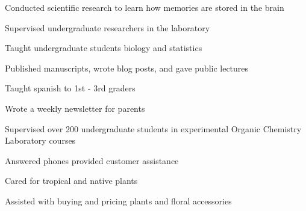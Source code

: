 \documentclass[]{deedy-resume-openfont}
\begin{document}
\begin{minipage}[t]{0.79\textwidth}

\begin{tightemize}
\item Conducted scientific research to learn how memories are stored in the brain
\item Supervised undergraduate researchers in the laboratory
\item Taught undergraduate students biology and statistics
\item Published manuscripts, wrote blog posts, and gave public lectures
\end{tightemize}
\sectionsep

\begin{tightemize}
\item Taught spanish to 1st - 3rd graders
\item Wrote a weekly newsletter for parents
\end{tightemize}
\sectionsep

\begin{tightemize}
\item Supervised over 200 undergraduate students in experimental Organic Chemistry Laboratory courses 
\end{tightemize}
\sectionsep

\begin{tightemize}
\item Answered phones provided customer assistance
\item Cared for tropical and native plants
\item Assisted with buying and pricing plants and floral accessories
\end{tightemize}
\sectionsep


\end{minipage}
\end{document}
